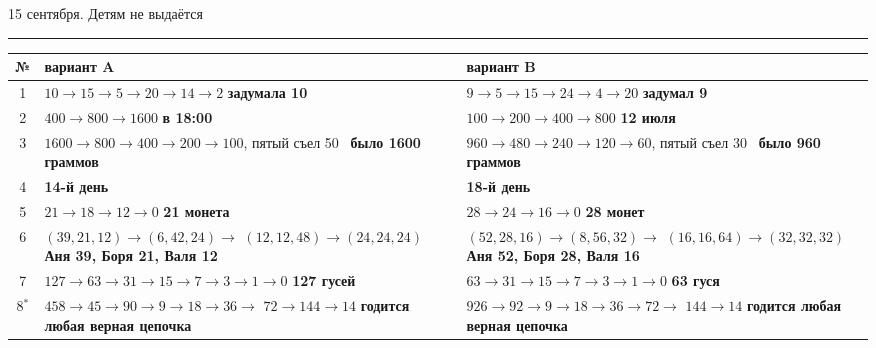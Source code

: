 \documentclass[12pt,a4paper]{article}
\begin{document}
\hfill{\small 15 сентября. Детям не выдаётся}
\vspace{4pt}\hrule\vspace{8pt}

\begin{tabular}{@{}c|p{7.6cm}|p{7.6cm}@{}}
\textbf{№} & \hfil\textbf{вариант A}\hfil & \hfil\textbf{вариант B}\hfil\\ \hline
1 & $10 \to 15 \to 5 \to 20 \to 14 \to 2$ \newline \textbf{задумала 10} & $9 \to 5 \to 15 \to 24 \to 4 \to 20$ \newline \textbf{задумал 9}\\ \hline
2 & $400 \to 800 \to 1600$ \newline \textbf{в 18:00} & $100 \to 200 \to 400 \to 800$ \newline \textbf{12 июля}\\ \hline
3 & $1600 \to 800 \to 400 \to 200 \to 100$, \newline пятый съел 50 \ \textbf{было 1600 граммов} & $960 \to 480 \to 240 \to 120 \to 60$, \newline пятый съел 30 \ \textbf{было 960 граммов}\\ \hline
4 & \textbf{14-й день} & \textbf{18-й день}\\ \hline
5 & $21 \to 18 \to 12 \to 0$ \newline \textbf{21 монета} & $28 \to 24 \to 16 \to 0$ \newline \textbf{28 монет}\\ \hline
6 & $(39,21,12) \to (6,42,24) \to$ \newline $(12,12,48) \to (24,24,24)$ \newline \textbf{Аня 39, Боря 21, Валя 12} & $(52,28,16) \to (8,56,32) \to$ \newline $(16,16,64) \to (32,32,32)$ \newline \textbf{Аня 52, Боря 28, Валя 16}\\ \hline
7 & $127 \to 63 \to 31 \to 15 \to 7 \to 3 \to 1 \to 0$ \newline \textbf{127 гусей} & $63 \to 31 \to 15 \to 7 \to 3 \to 1 \to 0$ \newline \textbf{63 гуся}\\ \hline
8$^*$ & $458 \to 45 \to 90 \to 9 \to 18 \to 36 \to$ \newline $72 \to 144 \to 14$ \newline \textbf{годится любая верная цепочка} & $926 \to 92 \to 9 \to 18 \to 36 \to 72 \to$ \newline $144 \to 14$ \newline \textbf{годится любая верная цепочка}\\ \hline

\end{tabular}
\end{document}
